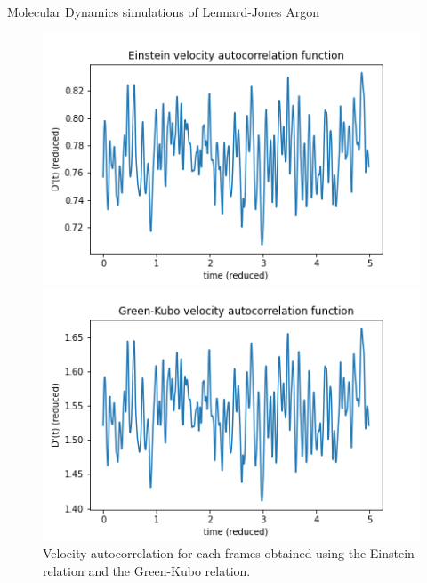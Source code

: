 \documentclass{article}
\begin{document}
\begin{section}{Molecular Dynamics simulations of Lennard-Jones Argon}
\begin{enumerate}[1.]
\begin{tcolorbox}[breakable]
		\begin{figure}[H]
			\centering
			\begin{minipage}{0.45\textwidth}
				\centering
				\includegraphics[width=\linewidth]{images/V_ac_einstein.png}
			\end{minipage}
			\begin{minipage}{0.45\textwidth}
				\centering
				\includegraphics[width=\linewidth]{images/V_ac_gkb.png}
			\end{minipage}
			\caption{Velocity autocorrelation for each frames obtained using the Einstein relation and the Green-Kubo relation.}
			\label{fig:V_ac}
		\end{figure}
	\end{tcolorbox}
\end{enumerate}
\end{section}
\end{document}
